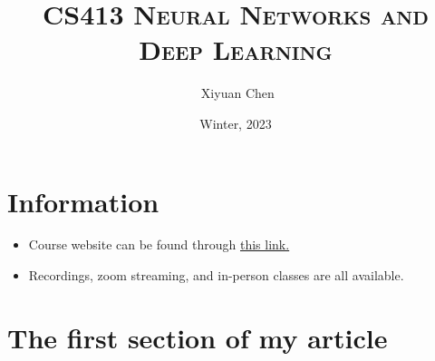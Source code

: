 \documentclass{ainote}
\author{\ccLogo \,\,Xiyuan Chen}
\title{\textsc{CS413 Neural Networks and Deep Learning}}
\date{Winter, 2023}
\begin{document}
\maketitle
\doclicenseThis
\section*{Information}
\begin{itemize}
	\item Course website can be found through \href{https://uoft-csc413.github.io/2023/}{this link. }
	\item Recordings, zoom streaming, and in-person classes are all available.
\end{itemize}
\tableofcontents
\newpage

\section{The first section of my article}
\end{document}
